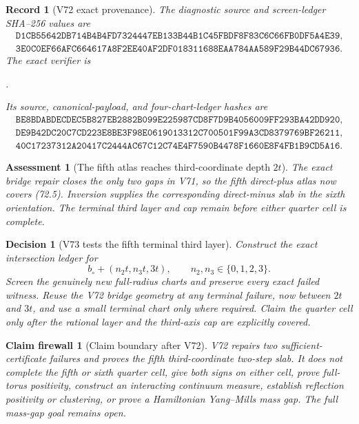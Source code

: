 \documentclass[11pt,oneside]{article}
\newtheorem{assessment}[theorem]{Assessment}
\newtheorem{firewall}[theorem]{Claim firewall}
\newtheorem{record}[theorem]{Record}
\newtheorem{decision}[theorem]{Decision}
\theoremstyle{definition}
\theoremstyle{remark}
\begin{document}
\begin{record}[V72 exact provenance]
\label{rec:newv72-provenance}
The diagnostic source and screen-ledger SHA--256 values are
\[
\begin{gathered}
\texttt{D1CB55642DB714B4B4FD7324447EB133B44B1C45FBDF8F83C6C66FB0DF5A4E39},\\
\texttt{3E0C0EF66AFC664617A8F2EE40AF2DF018311688EAA784AA589F29B44DC67936}.
\end{gathered}                                        \tag{72.11}
\]
The exact verifier is
\begin{center}
\footnotesize
{}.
\end{center}
Its source, canonical-payload, and four-chart-ledger hashes are
\[
\begin{gathered}
\texttt{BE8BDABDECDEC5B827EB2882B099E225987CD8F7D9B4056009FF293BA42DD920},\\
\texttt{DE9B42DC20C7CD223E8BE3F98E0619013312C700501F99A3CD8379769BF26211},\\
\texttt{40C17237312A20417C2444AC67C12C74E4F7590B4478F1660E8F4FB1B9CD5A16}.
\end{gathered}                                        \tag{72.12}
\]
\end{record}

\begin{assessment}[The fifth atlas reaches third-coordinate depth \(2t\)]
\label{ass:newv72}
The exact bridge repair closes the only two gaps in V71, so the
fifth direct-plus atlas now covers (72.5).  Inversion supplies the
corresponding direct-minus slab in the sixth orientation.  The
terminal third layer and cap remain before either quarter cell is
complete.
\end{assessment}

\begin{decision}[V73 tests the fifth terminal third layer]
\label{dec:newv72-next}
Construct the exact intersection ledger for
\[
 b_\circ+(n_2t,n_3t,3t),\qquad n_2,n_3\in\{0,1,2,3\}. \tag{72.13}
\]
Screen the genuinely new full-radius charts and preserve every
exact failed witness.  Reuse the V72 bridge geometry at any terminal
failure, now between \(2t\) and \(3t\), and use a small terminal
chart only where required.  Claim the quarter cell only after the
rational layer and the third-axis cap are explicitly covered.
\end{decision}

\begin{firewall}[Claim boundary after V72]
\label{fire:newv72-final}
V72 repairs two sufficient-certificate failures and proves the
fifth third-coordinate two-step slab.  It does not complete the
fifth or sixth quarter cell, give both signs on either cell, prove
full-torus positivity, construct an interacting continuum measure,
establish reflection positivity or clustering, or prove a
Hamiltonian Yang--Mills mass gap.  The full mass-gap goal remains
open.
\end{firewall}
\end{document}
